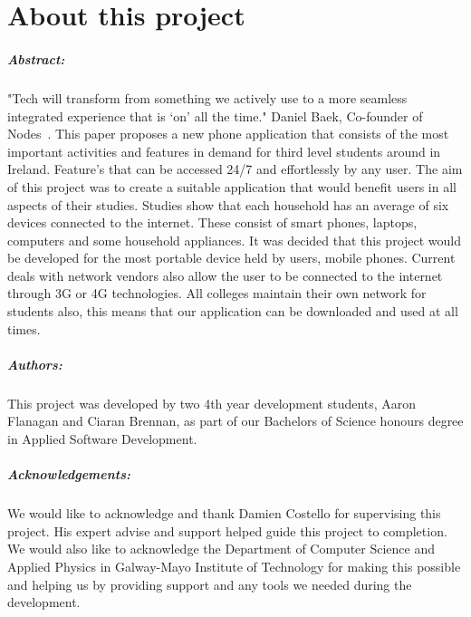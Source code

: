 
\chapter*{About this project}
\paragraph{Abstract:}
"Tech will transform from something we actively use to a more seamless integrated experience that is ‘on’ all the time." Daniel Baek, Co-founder of Nodes~\cite{nodes}. This paper proposes a new phone application that consists of the most important activities and features in demand for third level students around in Ireland. Feature's that can be accessed 24/7 and effortlessly by any user. The aim of this project was to create a suitable application that would benefit users in all aspects of their studies. Studies show that each household has an average of six devices connected to the internet. These consist of smart phones, laptops, computers and some household appliances. It was decided that this project would be developed for the most portable device held by users, mobile phones. Current deals with network vendors also allow the user to be connected to the internet through 3G or 4G technologies. All colleges maintain their own network for students also, this means that our application can be downloaded and used at all times.

\paragraph{Authors:}
This project was developed by two 4th year development students, Aaron Flanagan and Ciaran Brennan, as part of our Bachelors of Science honours degree in Applied Software Development.
\pagebreak
\paragraph{Acknowledgements:}
We would like to acknowledge and thank Damien Costello for supervising this project. His expert advise and support helped guide this project to completion. We would also like to acknowledge the Department of Computer Science and Applied Physics in Galway-Mayo Institute of Technology for making this possible and helping us by providing support and any tools we needed during the development.

